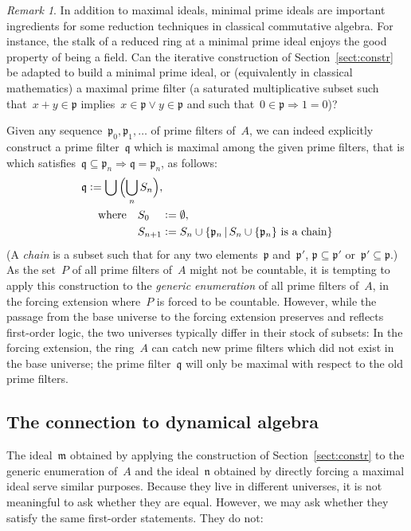\documentclass[com,11pt,crcready]{iosart2x}
\theoremstyle{definition}
\theoremstyle{plain}
\theoremstyle{remark}
\newtheorem{remark}[definition]{Remark}
\newcommand{\mmm}{\mathfrak{m}}
\newcommand{\nnn}{\mathfrak{n}}
\newcommand{\ppp}{\mathfrak{p}}
\newcommand{\qqq}{\mathfrak{q}}
\newcommand{\defeq}{\vcentcolon=}
\renewcommand{\_}{\mathpunct{.}\,}
\begin{document}
\begin{remark}In addition to maximal ideals, minimal prime ideals are important
ingredients for some reduction techniques in classical commutative algebra. For
instance, the stalk of a reduced ring at a minimal prime ideal enjoys the good
property of being a field. Can the iterative construction of Section~\ref{sect:constr} be adapted to
build a minimal prime ideal, or (equivalently in classical mathematics) a maximal prime
filter (a saturated multiplicative subset such that~$x + y \in \ppp$
implies~$x \in \ppp \vee y \in \ppp$ and such that~$0 \in \ppp \Rightarrow 1 = 0$)?

Given any sequence~$\ppp_0,\ppp_1,\ldots$ of prime filters of~$A$, we can indeed
explicitly construct a prime filter~$\qqq$ which is maximal among the given
prime filters, that is which satisfies~$\qqq \subseteq \ppp_n \Rightarrow \qqq
= \ppp_n$, as follows:
\begin{align*}
  \qqq &\defeq \bigcup\,\Bigl(\bigcup_n S_n\Bigr), \\
  &\quad\text{where}\quad S_{0\phantom{{}+n}} \defeq \emptyset, \\
  &\quad\phantom{\text{where}\quad} S_{n+1} \defeq S_n \cup \{ \ppp_n \,|\,
  \text{$S_n \cup \{\ppp_n\}$ is a chain} \}
\end{align*}
(A \emph{chain} is a subset such that for any two elements~$\ppp$ and~$\ppp'$,
$\ppp \subseteq \ppp'$ or~$\ppp' \subseteq \ppp$.) As the set~$P$ of all prime
filters of~$A$ might not be countable, it is tempting to apply this
construction to the \emph{generic enumeration} of all prime filters of~$A$,
in the forcing extension where~$P$ is forced to be countable. However,
while the passage from the base universe to the forcing extension preserves and
reflects first-order logic, the two universes typically differ in their stock
of subsets: In the forcing extension, the ring~$A$ can catch new prime filters
which did not exist in the base universe; the prime filter~$\qqq$ will only be
maximal with respect to the old prime filters.
\end{remark}


\subsection{The connection to dynamical algebra}

The ideal~$\mmm$ obtained by applying the construction of Section~\ref{sect:constr} to
the generic enumeration of~$A$ and the ideal~$\nnn$ obtained by directly forcing a
maximal ideal serve similar purposes. Because they live in different universes,
it is not meaningful to ask whether they are equal. However, we may ask whether
they satisfy the same first-order statements. They do not:
\end{document}
